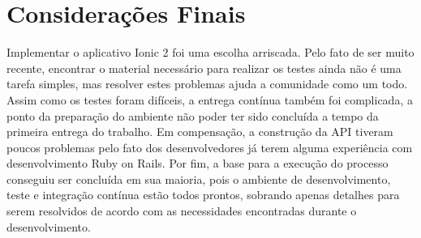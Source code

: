 \section{Considerações Finais}
Implementar o aplicativo Ionic 2 foi uma escolha arriscada. Pelo fato de ser muito recente, encontrar o material necessário para realizar os testes ainda não é uma tarefa simples, mas resolver estes problemas ajuda a comunidade como um todo. Assim como os testes foram difíceis, a entrega contínua também foi complicada, a ponto da preparação do ambiente não poder ter sido concluída a tempo da primeira entrega do trabalho. Em compensação, a construção da API tiveram poucos problemas pelo fato dos desenvolvedores já terem alguma experiência com desenvolvimento Ruby on Rails. Por fim, a base para a execução do processo conseguiu ser concluída em sua maioria, pois o ambiente de desenvolvimento, teste e integração contínua estão todos prontos, sobrando apenas detalhes para serem resolvidos de acordo com as necessidades encontradas durante o desenvolvimento.

